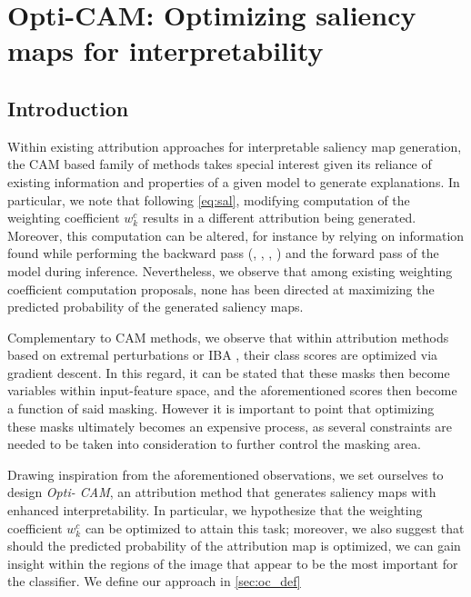 \chapter{Opti-CAM: Optimizing saliency maps for interpretability}
\chaptertoc{}
\label{ch:opticam}
\section{Introduction}
\label{sec:oc_intro}
\noindent Within existing attribution approaches for interpretable saliency map generation, the CAM 
\autocite{zhou2016learning} based family of methods takes special interest given its reliance of
existing  information and properties of a given model to generate explanations. In particular, we 
note that following \autoref{eq:sal}, modifying computation of the weighting coefficient 
$w_k^c$ results in a different attribution being generated. Moreover, this computation can be altered,
 for instance by relying on information found while performing the backward pass 
 (\cite{selvaraju2017grad}, \cite{chattopadhay2018grad}, \cite{axiombased}, 
 \cite{smilkov2017smoothgrad}) and the forward pass \autocite{wang2020score} of the model during 
 inference. Nevertheless, we observe that among existing weighting coefficient computation 
 proposals, none has been directed at maximizing the predicted probability of the generated 
 saliency maps.

Complementary to CAM methods, we observe that within attribution methods based on extremal 
perturbations \autocite{fong2019understanding} or IBA \autocite{schulz2020restricting}, 
their class scores are optimized via gradient descent. In this regard, it can 
be stated that these masks then become variables within input-feature space, and the aforementioned 
scores then become a function of said masking. However it is important to point that optimizing 
these masks ultimately becomes an expensive process, as several constraints are needed 
to be taken into consideration to further control the masking area.

Drawing inspiration from the aforementioned observations, we set ourselves to design \emph{Opti-
CAM}, an attribution method that generates saliency maps with enhanced interpretability. In 
particular, we hypothesize that the weighting coefficient $w_k^c$ can be optimized to attain this 
task; moreover, we also suggest that should the predicted probability of the attribution map is 
optimized, we can gain insight within the regions of the image that appear to be the most important 
for the classifier. We define our approach in \autoref{sec:oc_def}\\

